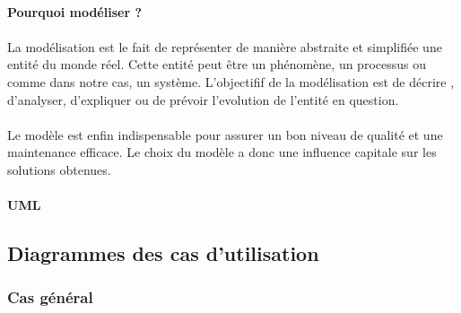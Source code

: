 
\paragraph{Pourquoi modéliser ?}
\paragraph{}
La modélisation est le fait de représenter de manière abstraite et simplifiée
une entité du monde réel. Cette entité peut être un phénomène, un processus ou 
comme dans notre cas, un système. L'objectifif de la modélisation est de décrire
, d'analyser, d'expliquer ou de prévoir l'evolution de l'entité en question.
\paragraph{}
Le modèle est enfin indispensable pour assurer un bon niveau de qualité 
et une maintenance efficace. Le choix du modèle a donc une influence capitale 
sur les solutions obtenues.
\paragraph{UML}
\paragraph{}
\subsection{Diagrammes des cas d'utilisation}
    \subsubsection{Cas général}
